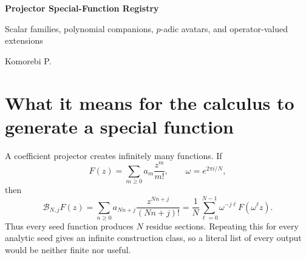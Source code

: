 \documentclass[11pt]{article}
\theoremstyle{definition}
\theoremstyle{remark}
\newcommand{\BNj}{\mathcal B_{N,j}}
\begin{document}
\begin{center}
{\LARGE\bfseries Projector Special-Function Registry}\par\vspace{0.35em}
{\large Scalar families, polynomial companions, $p$-adic avatars, and operator-valued extensions}\par\vspace{0.8em}
{\large Komorebi P.}\par
\end{center}

\begin{abstract}
The projector calculus does generate special-function families, but not every projected expression should be advertised as a new special function.  The block sections of the exponential are classical multisections and generalized hypergeometric functions; the same is true of several boundary cases involving Euler, Bernoulli, Appell, and higher-order Euler theory.  The calculus becomes distinct when it organizes normalized reciprocals, reciprocal-power towers, logarithmic-derivative companions, congruential inverse sections, packetwise Appell polynomials, zero-spectrum zeta functions, and $p$-adic block avatars inside one exact algebra.

This registry documents every canonical function family presently supported by the transfer-block corpus.  Each entry receives a definition, differential or recurrence law, product or refinement law, classical specialization, analytic status, arithmetic meaning, and novelty status.  The purpose is not to make a priority claim by naming a formula.  It is to identify which objects are classical sections, which are mathematically substantive derived families, which are credible candidates for new named functions, and which remain operator schemas rather than scalar special functions.
\end{abstract}

\tableofcontents
\clearpage

\section{What it means for the calculus to generate a special function}

A coefficient projector creates infinitely many functions.  If
\[
F(z)=\sum_{m\ge0}a_m\frac{z^m}{m!},
\qquad \omega=e^{2\pi i/N},
\]
then
\[
\BNj F(z)
=\sum_{n\ge0}a_{Nn+j}\frac{z^{Nn+j}}{(Nn+j)!}
=\frac1N\sum_{\ell=0}^{N-1}\omega^{-j\ell}F(\omega^\ell z).
\]
Thus every seed function produces $N$ residue sections.  Repeating this for every analytic seed gives an infinite construction class, so a literal list of every output would be neither finite nor useful.
\end{document}
